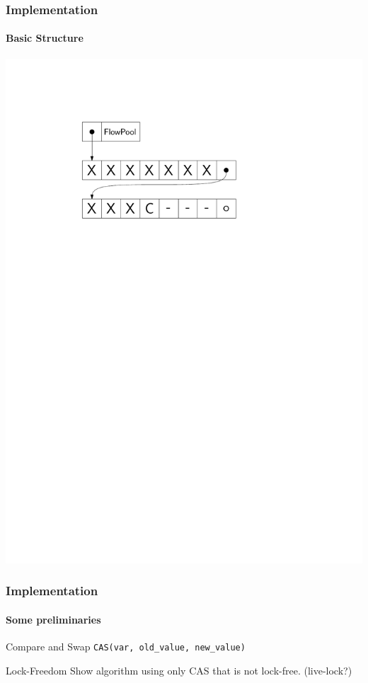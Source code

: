 \documentclass{beamer}
\begin{document}
\begin{frame}
  \frametitle{Implementation}
  \framesubtitle{Basic Structure}

  \centering
  \includegraphics{figs/SLFP}

\end{frame}

\begin{frame}
  \frametitle{Implementation}
  \framesubtitle{Some preliminaries}

  \begin{block}{Compare and Swap}
    \texttt{CAS(var, old\_value, new\_value)}
  \end{block}

  \begin{block}{Lock-Freedom}
    Show algorithm using only CAS that is not lock-free. (live-lock?)
  \end{block}

\end{frame}
\end{document}
